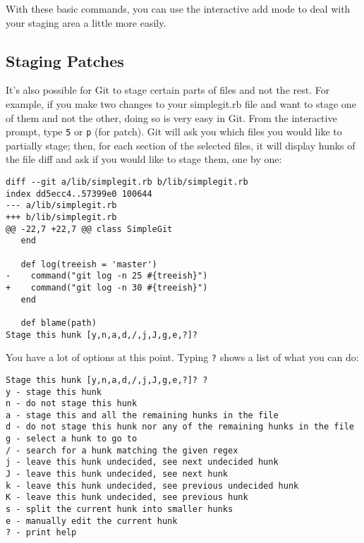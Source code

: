 \documentclass[a4paper]{book}
\begin{document}
With these basic commands, you can use the interactive add mode to deal with your staging area a little more easily.

\subsection{Staging Patches}\label{staging-patches}

It's also possible for Git to stage certain parts of files and not the rest. For example, if you make two changes to your simplegit.rb file and want to stage one of them and not the other, doing so is very easy in Git. From the interactive prompt, type \texttt{5} or \texttt{p} (for patch). Git will ask you which files you would like to partially stage; then, for each section of the selected files, it will display hunks of the file diff and ask if you would like to stage them, one by one:

\begin{shaded}\begin{verbatim}
diff --git a/lib/simplegit.rb b/lib/simplegit.rb
index dd5ecc4..57399e0 100644
--- a/lib/simplegit.rb
+++ b/lib/simplegit.rb
@@ -22,7 +22,7 @@ class SimpleGit
   end

   def log(treeish = 'master')
-    command("git log -n 25 #{treeish}")
+    command("git log -n 30 #{treeish}")
   end

   def blame(path)
Stage this hunk [y,n,a,d,/,j,J,g,e,?]?
\end{verbatim}\end{shaded}

You have a lot of options at this point. Typing \texttt{?} shows a list of what you can do:

\begin{shaded}\begin{verbatim}
Stage this hunk [y,n,a,d,/,j,J,g,e,?]? ?
y - stage this hunk
n - do not stage this hunk
a - stage this and all the remaining hunks in the file
d - do not stage this hunk nor any of the remaining hunks in the file
g - select a hunk to go to
/ - search for a hunk matching the given regex
j - leave this hunk undecided, see next undecided hunk
J - leave this hunk undecided, see next hunk
k - leave this hunk undecided, see previous undecided hunk
K - leave this hunk undecided, see previous hunk
s - split the current hunk into smaller hunks
e - manually edit the current hunk
? - print help
\end{verbatim}\end{shaded}
\end{document}
